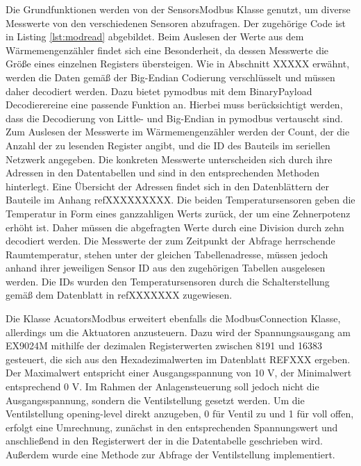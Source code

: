 

Die Grundfunktionen werden von der SensorsModbus Klasse genutzt, um diverse Messwerte von den verschiedenen Sensoren abzufragen. Der zugehörige Code ist in Listing \ref{lst:modread} abgebildet.
Beim Auslesen der Werte aus dem Wärmemengenzähler findet sich eine Besonderheit, da dessen Messwerte die Größe eines einzelnen Registers übersteigen. Wie in Abschnitt XXXXX erwähnt, werden die Daten gemäß der Big-Endian Codierung verschlüsselt und müssen daher decodiert werden. Dazu bietet pymodbus mit dem BinaryPayload Decodierereine eine passende Funktion an. Hierbei muss berücksichtigt werden, dass die Decodierung von Little- und Big-Endian in pymodbus vertauscht sind. Zum Auslesen der Messwerte im Wärmemengenzähler werden der Count, der die Anzahl der zu lesenden Register angibt, und die ID des Bauteils im seriellen Netzwerk angegeben. Die konkreten Messwerte unterscheiden sich durch ihre Adressen in den Datentabellen und sind in den entsprechenden Methoden hinterlegt. 
Eine Übersicht der Adressen findet sich in den Datenblättern der Bauteile im Anhang refXXXXXXXXX.
Die beiden Temperatursensoren geben die Temperatur in Form eines ganzzahligen Werts zurück, der um eine Zehnerpotenz erhöht ist. Daher müssen die abgefragten Werte durch eine Division durch zehn decodiert werden. Die Messwerte der zum Zeitpunkt der Abfrage herrschende Raumtemperatur, stehen unter der gleichen Tabellenadresse, müssen jedoch anhand ihrer jeweiligen Sensor ID aus den zugehörigen Tabellen ausgelesen werden. Die IDs wurden den Temperatursensoren durch die Schalterstellung gemäß dem Datenblatt in refXXXXXXX zugewiesen.



Die Klasse AcuatorsModbus erweitert ebenfalls die ModbusConnection Klasse, allerdings um die Aktuatoren anzusteuern. Dazu wird der Spannungsausgang am EX9024M mithilfe der dezimalen Registerwerten zwischen 8191 und 16383 gesteuert, die sich aus den Hexadezimalwerten im Datenblatt REFXXX ergeben. Der Maximalwert entspricht einer Ausgangsspannung von 10 V, der Minimalwert entsprechend 0 V. Im Rahmen der Anlagensteuerung soll jedoch nicht die Ausgangsspannung, sondern die Ventilstellung gesetzt werden. Um die Ventilstellung opening-level direkt anzugeben, 0 für Ventil zu und 1 für voll offen, erfolgt eine Umrechnung, zunächst in den entsprechenden Spannungswert und anschließend in den Registerwert der in die Datentabelle geschrieben wird. Außerdem wurde eine Methode zur Abfrage der Ventilstellung implementiert.

